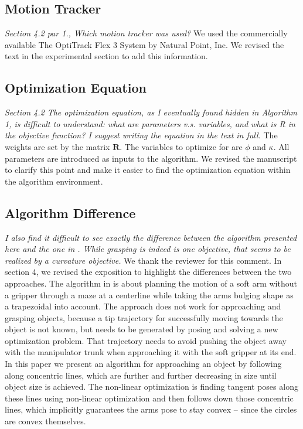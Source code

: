 \documentclass[letterpaper, 10 pt, twocolumn, conference]{article}
\begin{document}
\subsection{Motion Tracker}
\textit{Section 4.2 par 1., Which motion tracker was used?}
We used the commercially available The OptiTrack Flex 3 System by Natural Point, Inc. We revised the text in the experimental section to add this information.
%
\subsection{Optimization Equation}
\textit{Section 4.2 The optimization equation, as I eventually found hidden in Algorithm 1, is difficult to understand: what are parameters v.s. variables, and what is R in the objective function? I suggest writing the equation in the text in full.}
%
The weights are set by the matrix $\mathbf{R}$. The variables to optimize for are $\phi$ and $\kappa$. All parameters are introduced as inputs to the algorithm. We revised the manuscript to clarify this point and make it easier to find the optimization equation within the algorithm environment. 
%
\subsection{Algorithm Difference}
\textit{I also find it difficult to see exactly the difference between the algorithm presented here and the one in \cite{marchese2014whole}. While grasping is indeed is one objective, that seems to be realized by a curvature objective.} 
%
We thank the reviewer for this comment. In section 4, we revised the exposition to highlight the differences between the two approaches. The algorithm in \cite{marchese2014whole} is about planning the motion of a soft arm without a gripper through a maze at a centerline while taking the arms bulging shape as a trapezoidal into account. The approach does not work for approaching and grasping objects, because a tip trajectory for successfully moving towards the object is not known, but needs to be generated by posing and solving a new optimization problem. That trajectory needs to avoid pushing the object away with the manipulator trunk when approaching it with the soft gripper at its end. In this paper we present an algorithm for approaching an object by following along concentric lines, which are further and further decreasing in size until object size is achieved. The non-linear optimization is finding tangent poses along these lines using non-linear optimization and then follows down those concentric lines, which implicitly guarantees the arms pose to stay convex – since the circles are convex themselves.
%
\end{document}

